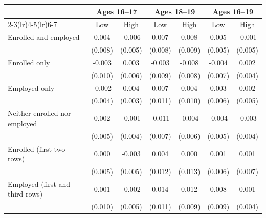 \begin{tabular}{lcccccc}
\toprule
 & \multicolumn{2}{c}{Ages 16--17} & \multicolumn{2}{c}{Ages 18--19} & \multicolumn{2}{c}{Ages 16--19} \\
\cmidrule(lr){2-3}\cmidrule(lr){4-5}\cmidrule(lr){6-7}
 & Low & High & Low & High & Low & High \\
\midrule
Enrolled and employed & 0.004 & -0.006 & 0.007 & 0.008 & 0.005 & -0.001 \\
 & (0.008) & (0.005) & (0.008) & (0.009) & (0.005) & (0.005) \\
Enrolled only & -0.003 & 0.003 & -0.003 & -0.008 & -0.004 & 0.002 \\
 & (0.010) & (0.006) & (0.009) & (0.008) & (0.007) & (0.004) \\
Employed only & -0.002 & 0.004 & 0.007 & 0.004 & 0.003 & 0.002 \\
 & (0.004) & (0.003) & (0.011) & (0.010) & (0.006) & (0.005) \\
Neither enrolled nor employed & 0.002 & -0.001 & -0.011 & -0.004 & -0.004 & -0.003 \\
 & (0.005) & (0.004) & (0.007) & (0.006) & (0.005) & (0.004) \\
Enrolled (first two rows) & 0.000 & -0.003 & 0.004 & 0.000 & 0.001 & 0.001 \\
 & (0.005) & (0.005) & (0.012) & (0.013) & (0.006) & (0.007) \\
Employed (first and third rows) & 0.001 & -0.002 & 0.014 & 0.012 & 0.008 & 0.001 \\
 & (0.010) & (0.005) & (0.011) & (0.009) & (0.009) & (0.004) \\
\bottomrule
\end{tabular}
